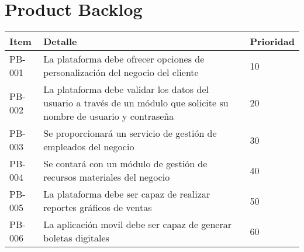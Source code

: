 \chapter{Product Backlog}

\begin{table}[htbp]
	\begin{center}
		\begin{tabular}{|p{1.5cm} | p{12cm} | p{2cm} |}
			\hline
			Item & Detalle & Prioridad  \\
			\hline
			PB-001 & La plataforma debe ofrecer opciones de personalización del negocio del cliente & 10  \\
			\hline
			PB-002 & La plataforma debe validar los datos del usuario a través de un módulo que solicite su nombre de usuario y contraseña & 20 \\
			\hline
			PB-003 & Se proporcionará un servicio de gestión de empleados del negocio & 30  \\
			\hline
			PB-004 & Se contará con un módulo de gestión de recursos materiales del negocio & 40 \\
			\hline	
			PB-005 & La plataforma debe ser capaz de realizar reportes gráficos de ventas & 50 \\
			\hline
			PB-006 & La aplicación movil debe ser capaz de generar boletas digitales & 60 \\
			\hline
		\end{tabular}
	\end{center}
\end{table}
